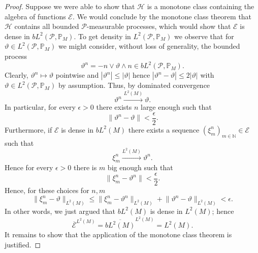 \documentclass[11pt,a4paper,twoside,openany]{report}
\numberwithin{equation}{section}
\theoremstyle{plain} %
\theoremstyle{definition} %
\theoremstyle{remark} %
\begin{document}
\begin{proof}
    
      Suppose we were able to show that \(\mathcal{H}\) is a monotone class containing the algebra of functions \(\mathcal{E}\). We would conclude by the monotone class theorem  that \(\mathcal{H}\) contains all bounded \(\mathcal{P}\)-measurable processes, which would show that \(\mathcal{E}\) is dense in \(bL^2(\mathcal{P},\mathbb{P}_M)\). To get density in \(L^2(\mathcal{P},\mathbb{P}_M)\) we observe that for \(\vartheta\in L^2(\mathcal{P},\mathbb{P}_M)\) we might consider, without loss of generality, the bounded process
    \begin{equation*}
        \vartheta^n=-n\vee \vartheta\wedge n\in bL^2(\mathcal{P},\mathbb{P}_M).
    \end{equation*}
 Clearly, \(\vartheta^n\mapsto \vartheta\) pointwise and \(|\vartheta^n|\leq|\vartheta|\) hence \(|\vartheta^n-\vartheta|\leq 2|\vartheta|\) with \(\vartheta\in L^2(\mathcal{P},\mathbb{P}_M)\) by assumption. Thus, by dominated convergence
    \begin{equation*}
        \vartheta^n\overset{L^2(M)}{\to}\vartheta.
    \end{equation*}
    In particular, for every \(\epsilon>0\) there exists \(n\) large enough such that
    \begin{equation*}
        \lVert \vartheta^n-\vartheta\rVert<\frac{\epsilon}{2}.
    \end{equation*}
    Furthermore, if \(\mathcal{E}\) is dense in \(bL^2(M)\) there exists a sequence \((\xi^n_m)_{m\in\mathbb{N}}\in\mathcal{E}\) such that 
    \begin{equation*}
         \xi^n_m\overset{L^2(M)}{\to}\vartheta^n.
    \end{equation*}
    Hence for every \(\epsilon>0\) there is \(m\) big enough such that
    \begin{equation*}
        \lVert \xi^n_m-\vartheta^n\rVert<\frac{\epsilon}{2}.
    \end{equation*}
    Hence, for these choices for \(n,m\)
    \begin{equation*}
        \lVert \xi^n_m-\vartheta\rVert_{L^2(M)}\leq\lVert \xi^n_m-\vartheta^n\rVert_{L^2(M)}+\lVert \vartheta^n-\vartheta\rVert_{L^2(M)}<\epsilon.
    \end{equation*}
    In other words, we just argued that \(bL^2(M)\) is dense in \(L^2(M)\); hence
    \begin{equation*}
        \overline{\mathcal{E}}^{L^2(M)}=\overline{bL^2(M)}^{L^2(M)}=L^2(M).
    \end{equation*}
 It remains to show that the application of the monotone class theorem is justified. 


\end{proof}
\end{document}

